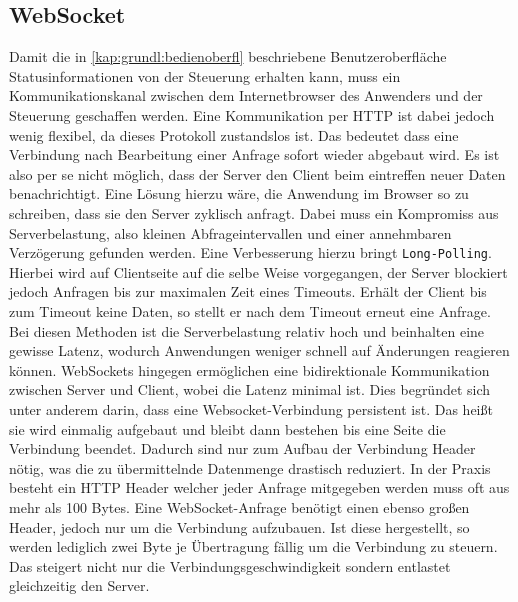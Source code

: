 \subsection{WebSocket} \label{chp:grdlgn:webSocket}
Damit die in \ref{kap:grundl:bedienoberfl} beschriebene Benutzeroberfläche Statusinformationen von der Steuerung erhalten kann, muss ein Kommunikationskanal zwischen dem Internetbrowser des Anwenders und der Steuerung geschaffen werden. Eine Kommunikation per HTTP ist dabei jedoch wenig flexibel, da dieses Protokoll zustandslos ist. Das bedeutet dass eine Verbindung nach Bearbeitung einer Anfrage sofort wieder abgebaut wird. Es ist also per se nicht möglich, dass der Server den Client beim eintreffen neuer Daten benachrichtigt. Eine Lösung hierzu wäre, die Anwendung im Browser so zu schreiben, dass sie den Server zyklisch anfragt. Dabei muss ein Kompromiss aus Serverbelastung, also kleinen Abfrageintervallen und einer annehmbaren Verzögerung gefunden werden. Eine Verbesserung hierzu bringt \texttt{Long-Polling}. Hierbei wird auf Clientseite auf die selbe Weise vorgegangen, der Server blockiert jedoch Anfragen bis zur maximalen Zeit eines Timeouts. Erhält der Client bis zum Timeout keine Daten, so stellt er nach dem Timeout erneut eine Anfrage. Bei diesen Methoden ist die Serverbelastung relativ hoch und beinhalten eine gewisse Latenz, wodurch Anwendungen weniger schnell auf Änderungen reagieren können. WebSockets \cite{BOOK:Websockets} hingegen ermöglichen eine bidirektionale Kommunikation zwischen Server und Client, wobei die Latenz minimal ist. Dies begründet sich unter anderem darin, dass eine Websocket-Verbindung persistent ist. Das heißt sie wird einmalig aufgebaut und bleibt dann bestehen bis eine Seite die Verbindung beendet. Dadurch sind nur zum Aufbau der Verbindung Header nötig, was die zu übermittelnde Datenmenge drastisch reduziert. In der Praxis besteht ein HTTP Header welcher jeder Anfrage mitgegeben werden muss oft aus mehr als 100 Bytes. Eine WebSocket-Anfrage benötigt einen ebenso großen Header, jedoch nur um die Verbindung aufzubauen. Ist diese hergestellt, so werden lediglich zwei Byte je Übertragung fällig um die Verbindung zu steuern. Das steigert nicht nur die Verbindungsgeschwindigkeit sondern entlastet gleichzeitig den Server. \cite{URL:WebSocketOrg}


